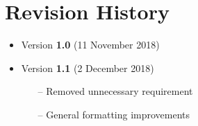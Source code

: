 \section{Revision History}
\begin{itemize}
    \item Version \textbf{1.0} (11 November 2018)
    \item Version \textbf{1.1} (2 December 2018)
    \begin{itemize}
    	\item[--] Removed unnecessary requirement
	\item[--] General formatting improvements
	\end{itemize}
\end{itemize}